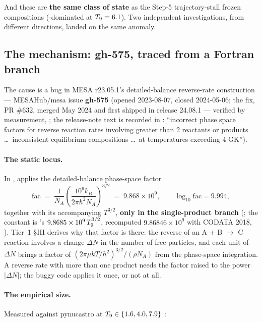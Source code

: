 And these are \textbf{the same class of state} as the Step-5 trajectory-stall
frozen compositions (-dominated at $T_{9} = 6.1$). Two independent
investigations, from different directions, landed on the same anomaly.

\subsection{The mechanism: gh-575, traced from a Fortran branch}
\label{sec:gh575}

The cause is a bug in MESA r23.05.1's detailed-balance reverse-rate
construction --- MESAHub/mesa issue \textbf{gh-575} \citep{gh575} (opened 2023-08-07, closed
2024-05-06; the fix, PR \#632, merged May 2024 and first shipped in release
24.08.1 --- verified by measurement, ; the release-note
text is recorded in : ``incorrect phase space factors
for reverse reaction rates involving greater than 2 reactants or products
\ldots\ inconsistent equilibrium compositions \ldots\ at temperatures exceeding
4 GK'').

\paragraph{The static locus.} In ,
 applies the detailed-balance phase-space factor
%
\begin{equation}\label{eq:revfac}
\mathrm{fac} \;=\; \frac{1}{N_A}\left(\frac{10^{9}k_B}{2\pi\hbar^{2}N_A}\right)^{3/2} \;=\; 9.868\times10^{9},
\qquad \log_{10}\mathrm{fac} = 9.994,
\end{equation}
%
together with its accompanying $T^{3/2}$, \textbf{only in the single-product
branch} (; the constant is
\citealt{rauscher2000}'s $9.8685 \times 10^{9}\,T_{9}^{3/2}$, recomputed
$9.86846 \times 10^{9}$ with CODATA 2018, \citealt{tiesinga2021}). Tier~1
\S III derives why that factor is there: the reverse of an
A + B $\to$ C reaction involves a change $\Delta N$ in the number of free
particles, and each unit of $\Delta N$ brings a factor of
$(2\pi\mu kT/h^{2})^{3/2}/(\rho N_A)$ from the phase-space integration. A
reverse rate with more than one product needs the factor raised to the power
$|\Delta N|$; the buggy code applies it once, or not at all.

\paragraph{The empirical size.} Measured against pynucastro at
$T_{9} \in \{1.6, 4.0, 7.9\}$ :


